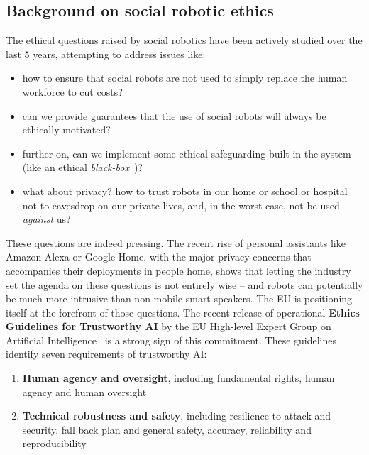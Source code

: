 \begin{rewrite}
\subsection{Background on social robotic ethics}\label{ethics}

The ethical questions raised by social robotics have been actively studied over
the last 5 years, attempting to address issues like:

\begin{itemize}
    \item how to ensure that social robots are not used to simply replace the human
        workforce to cut costs?
    \item can we provide guarantees that the use of social robots will always be
        ethically motivated?
    \item further on, can we implement some ethical safeguarding built-in
        the system (like an ethical \emph{black-box}~\cite{winfield2017case})?
    \item what about privacy? how to trust robots in our home or school or
        hospital not to eavesdrop on our private lives, and, in the worst
        case, not be used \emph{against} us?
\end{itemize}

These questions are indeed pressing. The recent rise of personal assistants like
Amazon Alexa or Google Home, with the major privacy concerns that accompanies
their deployments in people home, shows that letting the industry set the agenda
on these questions is not entirely wise -- and robots can potentially be much
more intrusive than non-mobile smart speakers.  The EU is positioning itself at
the forefront of those questions. The recent release of operational \textbf{Ethics
Guidelines for Trustworthy AI} by the EU High-level Expert Group on Artificial
Intelligence~\cite{eu2019ethics} is a strong sign of this commitment. These
guidelines identify seven requirements of trustworthy AI:

\begin{enumerate}[label=\textbf{R\arabic*}]
    \item \textbf{Human agency and oversight}, including
            fundamental rights, human agency and human oversight

    \item \textbf{Technical robustness and safety}, including resilience to
        attack and security, fall back plan and general safety, accuracy,
        reliability and reproducibility


\end{enumerate}
\end{rewrite}

